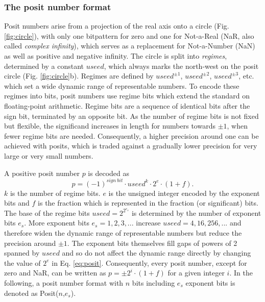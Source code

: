\documentclass[draft]{agujournal2019}
\begin{document}
\subsubsection{The posit number format}
\label{sec:posit_methods}

Posit numbers arise from a projection of the real axis onto a circle (Fig. \ref{fig:circle}),
with only one bitpattern for zero and one for Not-a-Real (NaR, also called \emph{complex infinity}),
which serves as a replacement for Not-a-Number (NaN) as well as positive and negative infinity.
The circle is split into \emph{regimes}, determined by a constant $useed$, which
always marks the north-west on the posit circle (Fig. \ref{fig:circle}b). Regimes
are defined by $useed^{\pm1}$, $useed^{\pm2}$, $useed^{\pm3}$, etc. which set a
wide dynamic range of representable numbers. To encode these regimes into bits,
posit numbers use regime bits which extend the standard on floating-point arithmetic.
Regime bits are a sequence of identical bits after the sign bit, terminated by an
opposite bit. As the number of regime bits is not fixed but flexible, the significand
increases in length for numbers towards $\pm1$, when fewer regime bits are needed.
Consequently, a higher precision around one can be achieved with posits, which
is traded against a gradually lower precision for very large or very small numbers.

A positive posit number $p$ is decoded as \cite{Gustafson2017,Gustafson2017a,Chen2018,Klower2019}
\begin{equation}
p = (-1)^{sign~bit} \cdot useed^k \cdot 2^e \cdot (1+f).
\label{eq:posit}
\end{equation}
$k$ is the number of regime bits. $e$ is the unsigned integer encoded by the
exponent bits and $f$ is the fraction which is represented in the fraction
(or significant) bits. The base of the regime bits $useed = 2^{2^{e_s}}$ is
determined by the number of exponent bits $e_s$. More exponent bits $e_s=1,2,3,...$
increase $useed = 4,16,256,...$ and therefore widen the dynamic range of representable
numbers but reduce the precision around $\pm1$. The exponent bits themselves fill
gaps of powers of 2 spanned by $useed$ and so do not affect
the dynamic range directly by changing the value of $2^e$ in Eq. \ref{eq:posit}.
Consequently, every posit number, except for zero and NaR, can be written as
$p = \pm 2^i \cdot (1+f)$ for a given integer $i$. In the following,
a posit number format with $n$ bits including $e_s$ exponent bits
is denoted as Posit($n$,$e_s$).
\end{document}
